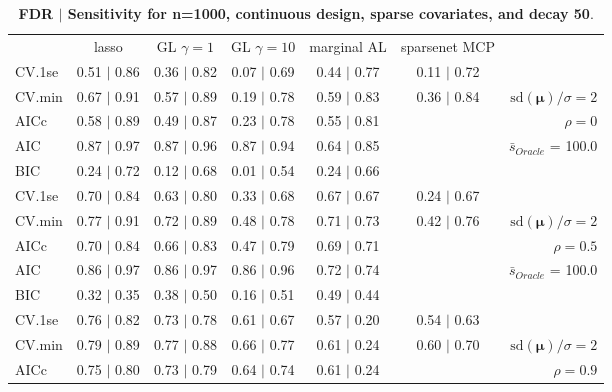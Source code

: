 \clearpage
\begin{table}\vspace{-.5cm}
\caption[l]{ {\it }
{ \bf FDR $\boldsymbol{\mid}$ Sensitivity for n=1000, continuous design, sparse covariates, and  decay  50}.}
\vspace{-.5cm}
\footnotesize{}
\begin{center}
\begin{tabular}{l*{5}{c}|r}
 & lasso & GL $\gamma=1$ & GL $\gamma=10$ & marginal AL & sparsenet MCP  & \\
 \cline{1-7}
CV.1se & 0.51 $\mid$ 0.86 & 0.36 $\mid$ 0.82 & 0.07 $\mid$ 0.69 & 0.44 $\mid$ 0.77 & 0.11 $\mid$ 0.72 & \\
CV.min & 0.67 $\mid$ 0.91 & 0.57 $\mid$ 0.89 & 0.19 $\mid$ 0.78 & 0.59 $\mid$ 0.83 & 0.36 $\mid$ 0.84 &  $\mathrm{sd}(\mathbf{\mu})/\sigma=2$ \\
AICc & 0.58 $\mid$ 0.89 & 0.49 $\mid$ 0.87 & 0.23 $\mid$ 0.78 & 0.55 $\mid$ 0.81 & & $\rho=0$ \\
AIC & 0.87 $\mid$ 0.97 & 0.87 $\mid$ 0.96 & 0.87 $\mid$ 0.94 & 0.64 $\mid$ 0.85 & &  \multirow{2}{*}{$\bar{s}_{Oracle}$ = 100.0} \\
BIC & 0.24 $\mid$ 0.72 & 0.12 $\mid$ 0.68 & 0.01 $\mid$ 0.54 & 0.24 $\mid$ 0.66 & &  \\
 \hline 
CV.1se & 0.70 $\mid$ 0.84 & 0.63 $\mid$ 0.80 & 0.33 $\mid$ 0.68 & 0.67 $\mid$ 0.67 & 0.24 $\mid$ 0.67 & \\
CV.min & 0.77 $\mid$ 0.91 & 0.72 $\mid$ 0.89 & 0.48 $\mid$ 0.78 & 0.71 $\mid$ 0.73 & 0.42 $\mid$ 0.76 &  $\mathrm{sd}(\mathbf{\mu})/\sigma=2$ \\
AICc & 0.70 $\mid$ 0.84 & 0.66 $\mid$ 0.83 & 0.47 $\mid$ 0.79 & 0.69 $\mid$ 0.71 & & $\rho=0.5$ \\
AIC & 0.86 $\mid$ 0.97 & 0.86 $\mid$ 0.97 & 0.86 $\mid$ 0.96 & 0.72 $\mid$ 0.74 & &  \multirow{2}{*}{$\bar{s}_{Oracle}$ = 100.0} \\
BIC & 0.32 $\mid$ 0.35 & 0.38 $\mid$ 0.50 & 0.16 $\mid$ 0.51 & 0.49 $\mid$ 0.44 & &  \\
 \hline 
CV.1se & 0.76 $\mid$ 0.82 & 0.73 $\mid$ 0.78 & 0.61 $\mid$ 0.67 & 0.57 $\mid$ 0.20 & 0.54 $\mid$ 0.63 & \\
CV.min & 0.79 $\mid$ 0.89 & 0.77 $\mid$ 0.88 & 0.66 $\mid$ 0.77 & 0.61 $\mid$ 0.24 & 0.60 $\mid$ 0.70 &  $\mathrm{sd}(\mathbf{\mu})/\sigma=2$ \\
AICc & 0.75 $\mid$ 0.80 & 0.73 $\mid$ 0.79 & 0.64 $\mid$ 0.74 & 0.61 $\mid$ 0.24 & & $\rho=0.9$ \\

\end{tabular}
\end{center}
\end{table}
